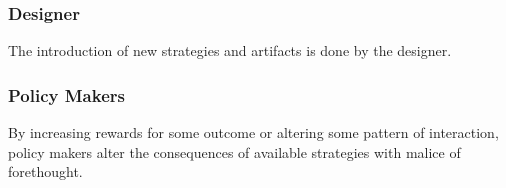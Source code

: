 \documentclass[jou,apacite]{apa6}
\begin{document}
\subsubsection{Designer}
The introduction of new strategies and artifacts is done by the designer.

\subsubsection{Policy Makers}
By increasing rewards for some outcome or altering some pattern of interaction, policy makers alter the consequences of available strategies with malice of forethought.

\end{document}
